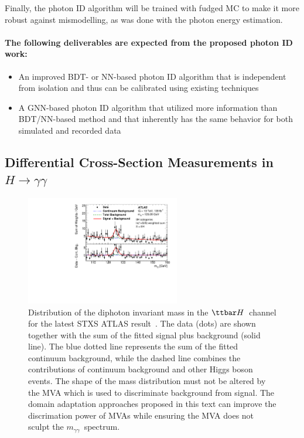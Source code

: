\documentclass[letter, USenglish, 11pt, subfigure]{article}
\newcommand{\ttH}{\ensuremath{\ttbar H}}
\newcommand{\myy}{\ensuremath{m_{\gamma\gamma}}}
\begin{document}
Finally, the photon ID algorithm will be trained with fudged MC to make it more robust against mismodelling, as was done with the photon energy estimation. 

\paragraph{The following deliverables are expected from the proposed photon ID work:}
\begin{itemize}
\item An improved BDT- or NN-based photon ID algorithm that is independent from isolation and thus can be calibrated using existing techniques
\item A GNN-based photon ID algorithm that utilized more information than BDT/NN-based method and that inherently has the same behavior for both simulated and recorded data
\end{itemize}

\subsection{Differential Cross-Section Measurements in $H\to\gamma\gamma$}
\begin{figure}[ht]
  \centering
  \includegraphics[width=0.6\textwidth]{figures/tth_myy.pdf}
  \caption{\label{fig:myy} Distribution of the diphoton invariant mass in the \ttH\ channel for the latest STXS ATLAS result~\cite{ATLAS_STXS}. The data (dots) are shown together with the sum of the fitted signal plus background (solid line). The blue dotted line represents the sum of the fitted continuum background, while the dashed line combines the contributions of continuum background and other Higgs boson events. The shape of the mass distribution must not be altered by the MVA which is used to discriminate background from signal. The domain adaptation approaches proposed in this text can improve the discrimation power of MVAs while ensuring the MVA does not sculpt the \myy\ spectrum.}
\end{figure}
\end{document}
